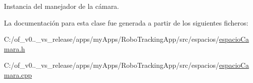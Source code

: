 Instancia del manejador de la cámara. 



La documentación para esta clase fue generada a partir de los siguientes ficheros\+:\begin{DoxyCompactItemize}
\item 
C\+:/of\+\_\+v0..\+\_\+vs\+\_\+release/apps/my\+Apps/\+Robo\+Tracking\+App/src/espacios/\hyperlink{espacio_camara_8h}{espacio\+Camara.\+h}\item 
C\+:/of\+\_\+v0..\+\_\+vs\+\_\+release/apps/my\+Apps/\+Robo\+Tracking\+App/src/espacios/\hyperlink{espacio_camara_8cpp}{espacio\+Camara.\+cpp}\end{DoxyCompactItemize}
